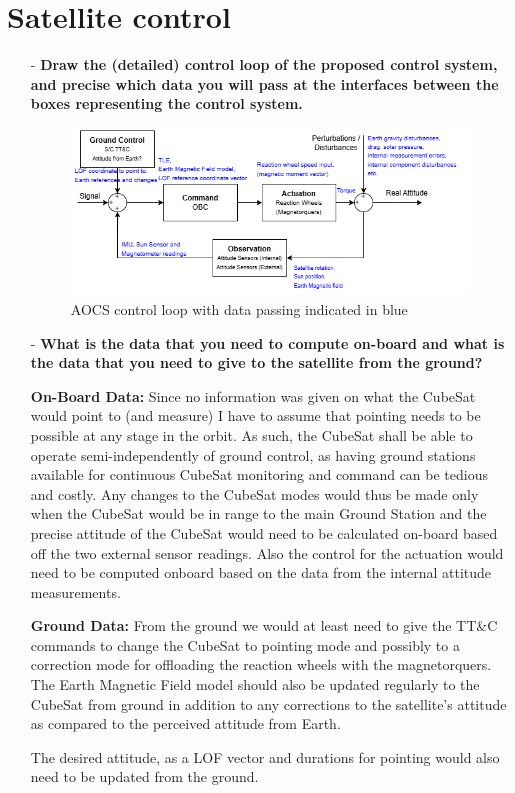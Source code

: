 \section{Satellite control}

\begin{itemize}
    \item[-] \textbf{Draw the (detailed) control loop of the proposed control system, and precise which data you will pass at the interfaces between the boxes representing the control system. }

    \begin{figure}[h]
        \centering
        \includegraphics[width=\linewidth]{Doc/Graphics/AOCS control loop.png}
        \caption{AOCS control loop with data passing indicated in blue }
        \label{fig:enter-label}
    \end{figure}
    
    \item[-] \textbf{What is the data that you need to compute on-board and what is the data that you need to give to the satellite from the ground? }

    \textbf{On-Board Data:}
    Since no information was given on what the CubeSat would point to (and measure) I have to assume that pointing needs to be possible at any stage in the orbit. 
    As such, the CubeSat shall be able to operate semi-independently of ground control, as having ground stations available for continuous CubeSat monitoring and command can be tedious and costly. 
    Any changes to the CubeSat modes would thus be made only when the CubeSat would be in range to the main Ground Station and the precise attitude of the CubeSat would need to be calculated on-board based off the two external sensor readings. 
    Also the control for the actuation would need to be computed onboard based on the data from the internal attitude measurements.

    
    \textbf{Ground Data:}
    From the ground we would at least need to give the TT\&C commands to change the CubeSat to pointing mode and possibly to a correction mode for offloading the reaction wheels with the magnetorquers. 
    The Earth Magnetic Field model should also be updated regularly to the CubeSat from ground in addition to any corrections to the satellite's attitude as compared to the perceived attitude from Earth.

    The desired attitude, as a LOF vector and durations for pointing would also need to be updated from the ground.
    
\end{itemize}
